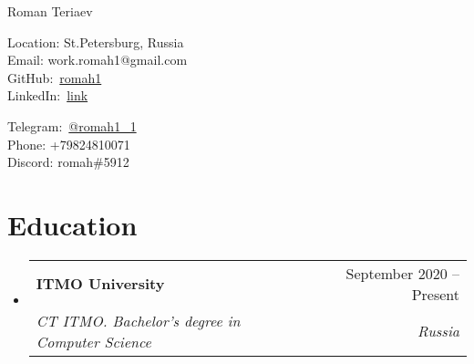 \documentclass[letterpaper,10pt]{article}
\makeatletter
\newcommand{\resumeSubheading}[4]{
  \vspace{-2pt}\item
    \begin{tabular*}{0.97\textwidth}[t]{l@{\extracolsep{\fill}}r}
      \textbf{#1} & #2 \\
      \textit{\small#3} & \textit{\small #4} \\
    \end{tabular*}\vspace{-7pt}
}
\newcommand{\resumeSubHeadingListStart}{\begin{itemize}[leftmargin=0.15in, label={}]}
\newcommand{\resumeSubHeadingListEnd}{\end{itemize}}
\makeatother
\begin{document}
\begin{center}
    {\LARGE Roman Teriaev} \\ \vspace{2pt}
    \begin{multicols}{2}
    \begin{flushleft}
    Location: St.Petersburg, Russia\\
    Email: work.romah1@gmail.com\\
    GitHub:\
    \href{{https://github.com/romah1}}{\color{blue}romah1}\\
    LinkedIn:\
    \href{{https://www.linkedin.com/in/roman-teriaev-939b06250/}}{\color{blue}link}\\
    \end{flushleft}
    
    \begin{flushright}
    Telegram:\
    \href{{https://t.me/romah1_1}}{\color{blue}@romah1\_1}\\
    Phone: +79824810071\\
    Discord: romah\#5912\\
    \end{flushright}
    \end{multicols}
\end{center}


\vspace{-2pt}
\section{Education}
  \resumeSubHeadingListStart
      \resumeSubheading
      {ITMO University}{September 2020 -- Present}
      {CT ITMO. Bachelor's degree in Computer Science}{Russia}

  \resumeSubHeadingListEnd


\end{document}
